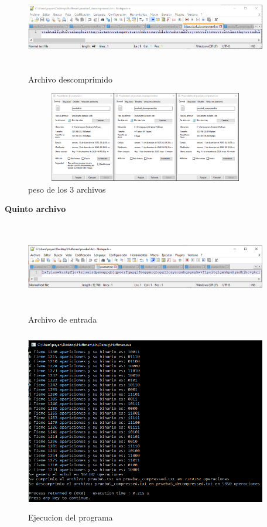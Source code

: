 \documentclass[spanish]{article}
\begin{document}
	\begin{figure}[H]
		\centering
		\includegraphics[width=400px,height=150px]{captura29}
		\caption{Archivo descomprimido}
	\end{figure}
	\begin{figure}[H]
		\centering
		\includegraphics[width=400px,height=150px]{captura30}
		\caption{peso de los 3 archivos}
	\end{figure}
	\textbf{Quinto archivo}
	\begin{figure}[H]
		\centering
		\includegraphics[width=400px,height=150px]{captura31}
		\caption{Archivo de entrada}
	\end{figure}
	\begin{figure}[H]
		\centering
		\includegraphics[width=400px,height=300px]{captura32}
		\caption{Ejecucion del programa}
	\end{figure}
\end{document}
